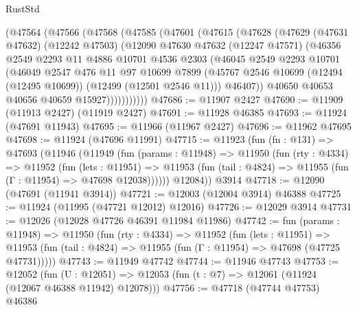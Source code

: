 \begin{lexlean}{RustStd}
\begin{coremodule}
{\begin{coremodule}
{{{{{{{{{{{{{{{{{{{{{{{{{{{{{{{{{{{{{{{{{{{{{{{{{{{{{{{{{{{{{{{{{{{{{{{{{{{{{{{{      (@47564
        (@47566
          (@47568
            (@47585
              (@47601
                (@47615
                  (@47628
                    (@47629
                      (@47631 @47632)
                      (@12242 @47503)
                      (@12090
                        @47630
                        @47632
                        (@12247 @47571)
                        (@46356
                          @2549
                          @2293
                          @11
                          @4886
                          @10701
                          @4536
                          @2303
                          (@46045
                            @2549
                            @2293
                            @10701
                            (@46049
                              @2547
                              @476
                              @11
                              @97
                              @10699
                              @7899
                              (@45767
                                @2546
                                @10699
                                (@12494 (@12495 @10699))
                                (@12499 (@12501 @2546 @11)))
                              @46407))
                          @40650
                          @40653
                          @40656
                          @40659
                          @15927)))))))))))
@47686 := @11907 @2427
@47690 := @11909 (@11913 @2427) (@11919 @2427)
@47691 := @11928 @46385
@47693 := @11924 (@47691 @11943)
@47695 := @11966 (@11967 @2427)
@47696 := @11962 @47695
@47698 := @11924 (@47696 @11991)
@47715 := @11923
    (fun (fn : @131) =>
    @47693
      (@11946
        (@11949
          (fun (params : @11948) =>
          @11950
            (fun (rty : @4334) =>
            @11952
              (fun (lets : @11951) =>
              @11953 (fun (tail : @4824) => @11955 (fun (Γ : @11954) => @47698 @12038))))))
        @12084))
    @3914
@47718 := @12090 (@47691 (@11941 @3914))
@47721 := @12003 (@12004 @3914) @46388
@47725 := @11924 (@11995 (@47721 @12012) @12016)
@47726 := @12029 @3914
@47731 := @12026 (@12028 @47726 @46391 @11984 @11986)
@47742 := fun (params : @11948) =>
  @11950
    (fun (rty : @4334) =>
    @11952
      (fun (lets : @11951) =>
      @11953 (fun (tail : @4824) => @11955 (fun (Γ : @11954) => @47698 (@47725 @47731)))))
@47743 := @11949 @47742
@47744 := @11946 @47743
@47753 := @12052
    (fun (U : @12051) => @12053 (fun (t : @7) => @12061 (@11924 (@12067 @46388 @11942) @12078)))
@47756 := @47718 (@47744 @47753) @46386
}}}}}}}}}}}}}}}}}}}}}}}}}}}}}}}}}}}}}}}}}}}}}}}}}}}}}}}}}}}}}}}}}}}}}}}}}}}}}}}}
\end{coremodule}}
\end{coremodule}
\end{lexlean}

